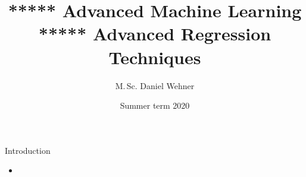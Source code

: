 




\title[Advanced Regression Techniques]{***** Advanced Machine Learning ***** Advanced Regression Techniques}
\author{M.\,Sc. Daniel Wehner}
\date{Summer term 2020}




\dwPrintTitle

\dwPrintToc


\begin{dwHeaderFrame}{Introduction}
	\begin{itemize}
		\item 
	\end{itemize}
\end{dwHeaderFrame}



